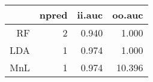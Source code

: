 \begin{table}[ht]
\centering
\begin{tabular}{rrrr}
  \hline
 & npred & ii.auc & oo.auc \\ 
  \hline
RF &    2 & 0.940 & 1.000 \\ 
  LDA &    1 & 0.974 & 1.000 \\ 
  MnL &    1 & 0.974 & 10.396 \\ 
   \hline
\end{tabular}
\label{tab:second_res}
\end{table}
